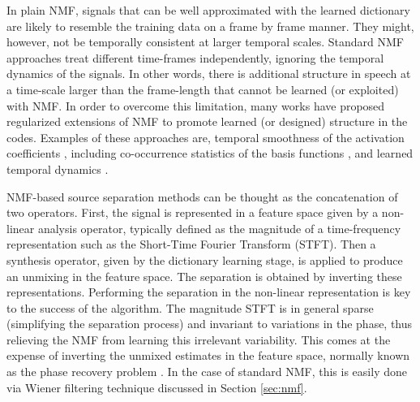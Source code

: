In plain NMF, signals that can be well approximated with the learned dictionary are
likely to resemble the training data on a frame by frame manner. They might, however, 
not be temporally consistent at larger temporal scales.
 Standard NMF approaches treat different time-frames independently, ignoring the 
temporal dynamics of the signals. In other words, there is additional structure in speech at a time-scale larger than
the frame-length that cannot be learned (or exploited) with NMF. In order to overcome this limitation,  
many works have proposed regularized extensions of NMF to promote learned (or designed) structure in the codes. Examples of these approaches are, temporal smoothness of the activation coefficients \cite{fevotte2011majorization}, including  co-occurrence statistics of the basis functions \cite{WilsonRSD08}, and learned temporal dynamics \cite{MysoreS11,HanMP12,icassp13a,mohammadiha2013nonnegative}.

NMF-based source separation methods can be thought as the concatenation of two operators.
First, the signal is represented in a feature space given by a non-linear analysis operator, 
typically defined as the magnitude of a time-frequency representation such
as the Short-Time Fourier Transform (STFT). 
Then a synthesis operator, given by the dictionary learning stage, is applied to produce an unmixing in the feature space.
 The separation is obtained by inverting these representations. 
Performing the separation in the non-linear representation is key to the success of the algorithm. The magnitude STFT is in general sparse (simplifying the separation process) and invariant to variations in the phase, thus relieving the NMF from
learning this irrelevant variability. 
This comes at the expense of inverting the unmixed estimates in the feature space, normally known as the
phase recovery problem \cite{yonina}. In the case of standard NMF, this is easily done via Wiener filtering technique discussed in Section \ref{sec:nmf}.

